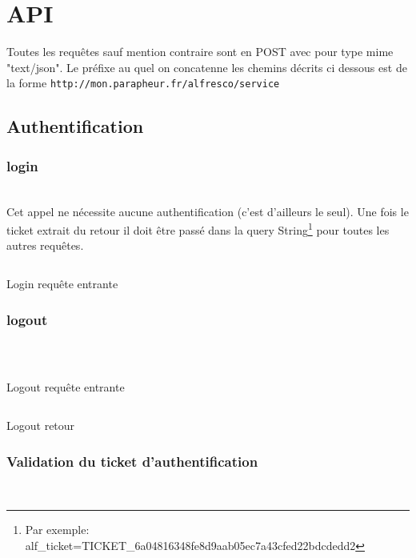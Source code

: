 \section{API}

Toutes les requêtes sauf mention contraire sont en POST avec pour type mime "text/json". Le préfixe au quel on concatenne les chemins décrits ci dessous est de la forme \verb|http://mon.parapheur.fr/alfresco/service|

\subsection{Authentification}

\subsubsection{login}
\\

Cet appel ne nécessite aucune authentification (c'est d'ailleurs le seul). Une fois le ticket extrait du retour il doit être passé dans la query String\footnote{Par exemple: alf\_ticket=TICKET\_6a04816348fe8d9aab05ec7a43cfed22bdcdedd2} pour toutes les autres requêtes.

\begin{codesnippet}
\inputminted[frame=single,linenos,fontsize=\footnotesize]{javascript}{extraits/login_in.js}
\caption{Login requête entrante}
\label{snip:login_in}
\end{codesnippet}


\subsubsection{logout}
\\

\begin{codesnippet}
\inputminted[frame=single,linenos,fontsize=\footnotesize]{javascript}{extraits/logout_in.js}
\caption{Logout requête entrante}
\label{snip:logout_in}
\end{codesnippet}

\begin{codesnippet}
\inputminted[frame=single,linenos,fontsize=\footnotesize]{javascript}{extraits/logout_out.js}
\caption{Logout retour}
\label{snip:logout_out}
\end{codesnippet}


\subsubsection{Validation du ticket d'authentification}
\\

